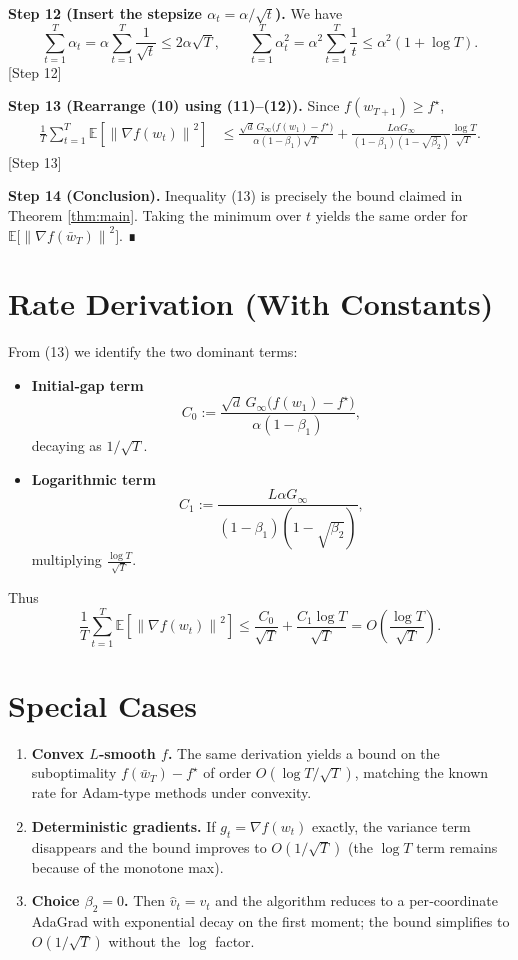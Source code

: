\documentclass{article}
\newcommand{\EE}{\mathbb{E}}
\newcommand{\norm}[1]{\left\|#1\right\|}
\begin{document}
\noindent\textbf{Step 12 (Insert the stepsize $\alpha_{t}=\alpha/\sqrt{t}$).}
We have
\[
\sum_{t=1}^{T}\alpha_{t} = \alpha\sum_{t=1}^{T}\frac{1}{\sqrt{t}}
   \le 2\alpha\sqrt{T},\qquad
\sum_{t=1}^{T}\alpha_{t}^{2}
   = \alpha^{2}\sum_{t=1}^{T}\frac{1}{t}
   \le \alpha^{2}(1+\log T). \tag{12}
\]
[Step 12]

\noindent\textbf{Step 13 (Rearrange (10) using (11)–(12)).}
Since $f(w_{T+1})\ge f^{\star}$,
\begin{align}
    \frac{1}{T}\sum_{t=1}^{T}\EE\!\left[\norm{\nabla f(w_{t})}^{2}\right]
    &\le 
      \frac{ \sqrt{d}\,G_{\infty}\bigl(f(w_{1})-f^{\star}\bigr)}{\alpha(1-\beta_{1})\sqrt{T}}
      +\frac{L\alpha G_{\infty}}{(1-\beta_{1})(1-\sqrt{\beta_{2}})}\frac{\log T}{\sqrt{T}}.
      \tag{13}
\end{align}
[Step 13]

\noindent\textbf{Step 14 (Conclusion).}
Inequality (13) is precisely the bound claimed in Theorem \ref{thm:main}.  Taking the minimum over $t$ yields the same order for $\EE\!\big[\norm{\nabla f(\bar w_T)}^{2}\big]$.  ∎

\section*{Rate Derivation (With Constants)}
From (13) we identify the two dominant terms:

\begin{itemize}
\item \textbf{Initial‑gap term} 
\[
C_{0}:=\frac{\sqrt{d}\,G_{\infty}\bigl(f(w_{1})-f^{\star}\bigr)}{\alpha(1-\beta_{1})},
\]
decaying as $1/\sqrt{T}$.
\item \textbf{Logarithmic term}
\[
C_{1}:=\frac{L\alpha G_{\infty}}{(1-\beta_{1})(1-\sqrt{\beta_{2}})},
\]
multiplying $\frac{\log T}{\sqrt{T}}$.
\end{itemize}
Thus
\[
\frac{1}{T}\sum_{t=1}^{T}\EE\!\left[\norm{\nabla f(w_{t})}^{2}\right]
\le \frac{C_{0}}{\sqrt{T}}+\frac{C_{1}\log T}{\sqrt{T}}
= O\!\left(\frac{\log T}{\sqrt{T}}\right).
\]

\section*{Special Cases}
\begin{enumerate}[label=\alph*.]
\item \textbf{Convex $L$‑smooth $f$.}  The same derivation yields a bound on the suboptimality $f(\bar w_T)-f^{\star}$ of order $O(\log T/\sqrt{T})$, matching the known rate for Adam‑type methods under convexity.
\item \textbf{Deterministic gradients.}  If $g_{t}=\nabla f(w_{t})$ exactly, the variance term disappears and the bound improves to $O(1/\sqrt{T})$ (the $\log T$ term remains because of the monotone max).
\item \textbf{Choice $\beta_{2}=0$.}  Then $\hat v_t=v_t$ and the algorithm reduces to a per‑coordinate AdaGrad with exponential decay on the first moment; the bound simplifies to $O(1/\sqrt{T})$ without the $\log$ factor.
\end{enumerate}
\end{document}
